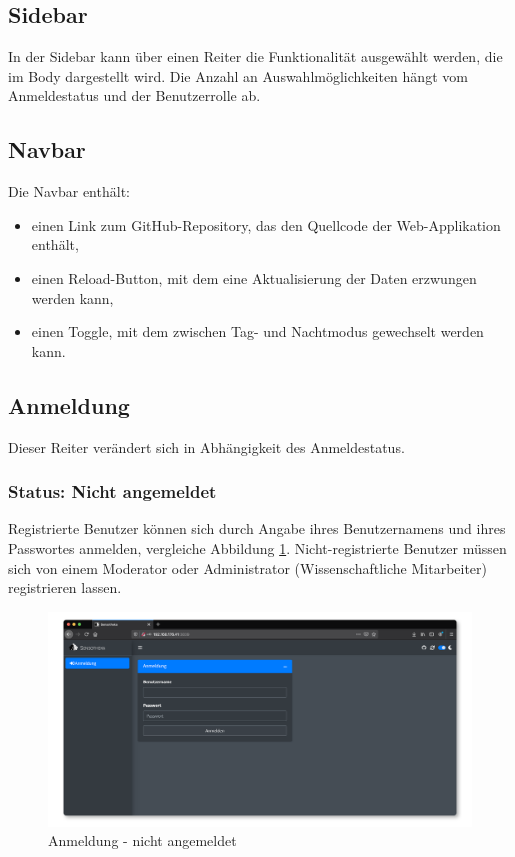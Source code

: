 \documentclass[
]{article}
\providecommand{\tightlist}{%
  \setlength{\itemsep}{0pt}\setlength{\parskip}{0pt}}
\begin{document}
\hypertarget{sidebar}{%
\subsection{Sidebar}\label{sidebar}}

In der Sidebar kann über einen Reiter die Funktionalität ausgewählt werden, die im Body dargestellt wird. Die Anzahl an Auswahlmöglichkeiten hängt vom Anmeldestatus und der Benutzerrolle ab.

\hypertarget{navbar}{%
\subsection{Navbar}\label{navbar}}

Die Navbar enthält:

\begin{itemize}
\tightlist
\item
  einen Link zum GitHub-Repository, das den Quellcode der Web-Applikation enthält,
\item
  einen Reload-Button, mit dem eine Aktualisierung der Daten erzwungen werden kann,
\item
  einen Toggle, mit dem zwischen Tag- und Nachtmodus gewechselt werden kann.
\end{itemize}

\hypertarget{login}{%
\subsection{Anmeldung}\label{login}}

Dieser Reiter verändert sich in Abhängigkeit des Anmeldestatus.

\hypertarget{status-nicht-angemeldet}{%
\subsubsection{Status: Nicht angemeldet}\label{status-nicht-angemeldet}}

Registrierte Benutzer können sich durch Angabe ihres Benutzernamens und ihres Passwortes anmelden, vergleiche Abbildung \ref{fig:login-mask}. Nicht-registrierte Benutzer müssen sich von einem Moderator oder Administrator (Wissenschaftliche Mitarbeiter) registrieren lassen.

\begin{figure}
\centering
\includegraphics{./img/login_mask.png}
\caption{\label{fig:login-mask}Anmeldung - nicht angemeldet}
\end{figure}
\end{document}
